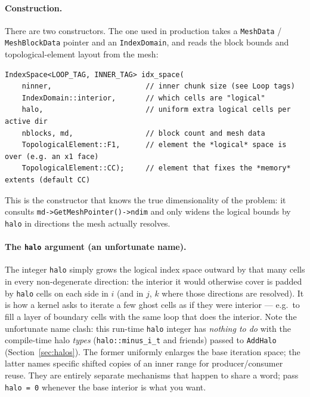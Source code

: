 \documentclass[11pt]{article}
\newcommand{\code}[1]{\lstinline[basicstyle=\ttfamily]|#1|}
\begin{document}
\paragraph{Construction.} There are two constructors. The one used in production
takes a \code{MeshData} / \code{MeshBlockData} pointer and an
\code{IndexDomain}, and reads the block bounds and topological-element layout from
the mesh:
\begin{lstlisting}
IndexSpace<LOOP_TAG, INNER_TAG> idx_space(
    ninner,                      // inner chunk size (see Loop tags)
    IndexDomain::interior,       // which cells are "logical"
    halo,                        // uniform extra logical cells per active dir
    nblocks, md,                 // block count and mesh data
    TopologicalElement::F1,      // element the *logical* space is over (e.g. an x1 face)
    TopologicalElement::CC);     // element that fixes the *memory* extents (default CC)
\end{lstlisting}
This is the constructor that knows the true dimensionality of the problem: it
consults \code{md->GetMeshPointer()->ndim} and only widens the logical bounds by
\code{halo} in directions the mesh actually resolves.

\paragraph{The \code{halo} argument (an unfortunate name).} The integer \code{halo}
simply grows the logical index space outward by that many cells in every
non-degenerate direction: the interior it would otherwise cover is padded by
\code{halo} cells on each side in $i$ (and in $j$, $k$ where those directions are
resolved). It is how a kernel asks to iterate a few ghost cells as if they were
interior --- e.g.\ to fill a layer of boundary cells with the same loop that does
the interior. Note the unfortunate name clash: this run-time \code{halo} integer
has \emph{nothing to do} with the compile-time halo \emph{types}
(\code{halo::minus_i_t} and friends) passed to \code{AddHalo}
(Section~\ref{sec:halos}). The former uniformly enlarges the base iteration space;
the latter names specific shifted copies of an inner range for producer/consumer
reuse. They are entirely separate mechanisms that happen to share a word; pass
\code{halo = 0} whenever the base interior is what you want.
\end{document}
